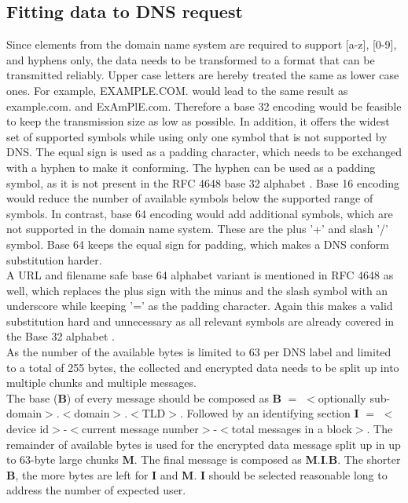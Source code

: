     \subsection{Fitting data to DNS request}
        \label{subsec:software_design:fitting}
        Since elements from the domain name system are required to support [a-z], [0-9], and hyphens only, the data needs to be transformed to a format that can be transmitted reliably. Upper case letters are hereby treated the same as lower case ones.
        For example, EXAMPLE.COM. would lead to the same result as example.com. and ExAmPlE.com.
        Therefore a base 32 encoding would be feasible to keep the transmission size as low as possible. In addition, it offers the widest set of supported symbols while using only one symbol that is not supported by DNS. The equal sign is used as a padding character, which needs to be exchanged with a hyphen to make it conforming. The hyphen can be used as a padding symbol, as it is not present in the RFC 4648 base 32 alphabet \cite{josefsson_simonjosefssonorg_base16_2006}. Base 16 encoding would reduce the number of available symbols below the supported range of symbols. In contrast, base 64 encoding would add additional symbols, which are not supported in the domain name system. These are the plus '+' and slash '/' symbol. Base 64 keeps the equal sign for padding, which makes a DNS conform substitution harder.\\
        A URL and filename safe base 64 alphabet variant is mentioned in RFC 4648 as well, which replaces the plus sign with the minus and the slash symbol with an underscore while keeping '=' as the padding character. Again this makes a valid substitution hard and unnecessary as all relevant symbols are already covered in the Base 32 alphabet \cite{josefsson_simonjosefssonorg_base16_2006}.\\
        
        As the number of the available bytes is limited to 63 per DNS label and limited to a total of 255 bytes, the collected and encrypted data needs to be split up into multiple chunks and multiple messages.\\
        The base (\textbf{B}) of every message should be composed as \textbf{B} $=$ $<$optionally sub-domain$>$.$<$domain$>$.$<$TLD$>$.
        Followed by an identifying section \textbf{I} $=$ $<$device id$>$-$<$current message number$>$-$<$total messages in a block$>$. 
        The remainder of available bytes is used for the encrypted data message split up in up to 63-byte large chunks \textbf{M}.
        The final message is composed as \textbf{M}.\textbf{I}.\textbf{B}. The shorter \textbf{B}, the more bytes are left for \textbf{I} and \textbf{M}. \textbf{I} should be selected reasonable long to address the number of expected user.\\
        
